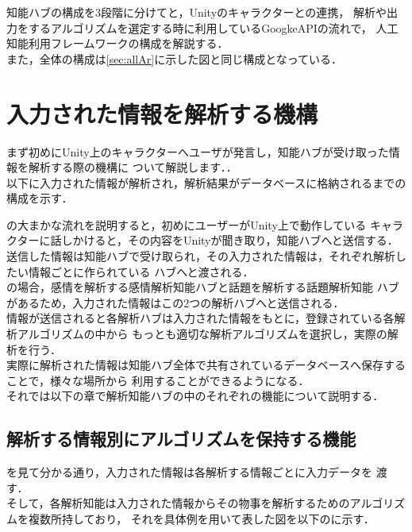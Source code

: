
知能ハブの構成を3段階に分けてと，Unityのキャラクターとの連携，
解析や出力をするアルゴリズムを選定する時に利用しているGoogkeAPIの流れで，
人工知能利用フレームワークの構成を解説する．
\\
また，全体の構成は\ref{sec:allAr}に示した図と同じ構成となっている．
\section{入力された情報を解析する機構}
まず初めにUnity上のキャラクターへユーザが発言し，知能ハブが受け取った情報を解析する際の機構に
ついて解説します．．\\

以下に入力された情報が解析され，解析結果がデータベースに格納されるまでの
構成を示す．

の大まかな流れを説明すると，初めにユーザーがUnity上で動作している
キャラクターに話しかけると，その内容をUnityが聞き取り，知能ハブへと送信する．
\\
送信した情報は知能ハブで受け取られ，その入力された情報は，それぞれ解析したい情報ごとに作られている
ハブへと渡される．
\\
の場合，感情を解析する感情解析知能ハブと話題を解析する話題解析知能
ハブがあるため，入力された情報はこの2つの解析ハブへと送信される．
\\
情報が送信されると各解析ハブは入力された情報をもとに，登録されている各解析アルゴリズムの中から
もっとも適切な解析アルゴリズムを選択し，実際の解析を行う．
\\
実際に解析された情報は知能ハブ全体で共有されているデータベースへ保存することで，様々な場所から
利用することができるようになる．
\\

それでは以下の章で解析知能ハブの中のそれぞれの機能について説明する．


\subsection{解析する情報別にアルゴリズムを保持する機能}
を見て分かる通り，入力された情報は各解析する情報ごとに入力データを
渡す．
\\
そして，各解析知能は入力された情報からその物事を解析するためのアルゴリズムを複数所持しており，
それを具体例を用いて表した図を以下のに示す．

